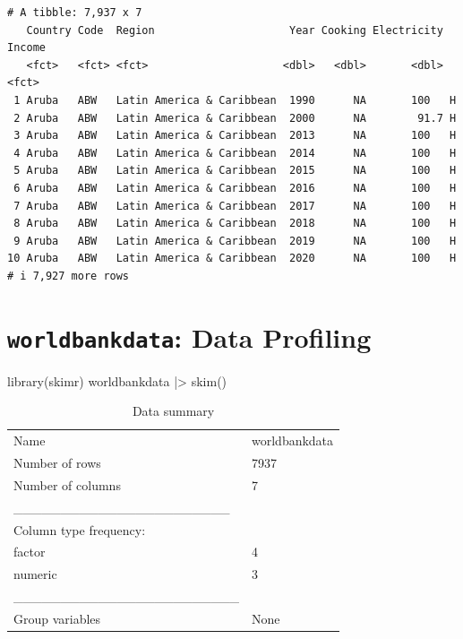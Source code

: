 \documentclass[
  letterpaper,
  DIV=11,
  numbers=noendperiod]{scrreprt}
\newenvironment{Shaded}{\begin{snugshade}}{\end{snugshade}}
\newcommand{\FunctionTok}[1]{\textcolor[rgb]{0.28,0.35,0.67}{#1}}
\newcommand{\NormalTok}[1]{\textcolor[rgb]{0.00,0.23,0.31}{#1}}
\newcommand{\SpecialCharTok}[1]{\textcolor[rgb]{0.37,0.37,0.37}{#1}}
\begin{document}
\begin{verbatim}
# A tibble: 7,937 x 7
   Country Code  Region                     Year Cooking Electricity Income
   <fct>   <fct> <fct>                     <dbl>   <dbl>       <dbl> <fct> 
 1 Aruba   ABW   Latin America & Caribbean  1990      NA       100   H     
 2 Aruba   ABW   Latin America & Caribbean  2000      NA        91.7 H     
 3 Aruba   ABW   Latin America & Caribbean  2013      NA       100   H     
 4 Aruba   ABW   Latin America & Caribbean  2014      NA       100   H     
 5 Aruba   ABW   Latin America & Caribbean  2015      NA       100   H     
 6 Aruba   ABW   Latin America & Caribbean  2016      NA       100   H     
 7 Aruba   ABW   Latin America & Caribbean  2017      NA       100   H     
 8 Aruba   ABW   Latin America & Caribbean  2018      NA       100   H     
 9 Aruba   ABW   Latin America & Caribbean  2019      NA       100   H     
10 Aruba   ABW   Latin America & Caribbean  2020      NA       100   H     
# i 7,927 more rows
\end{verbatim}

\section*{\texorpdfstring{\texttt{worldbankdata}: Data
Profiling}{worldbankdata: Data Profiling}}\label{worldbankdata-data-profiling}


\begin{Shaded}
\begin{Highlighting}[]
\FunctionTok{library}\NormalTok{(skimr)}
\NormalTok{worldbankdata }\SpecialCharTok{|\textgreater{}} 
  \FunctionTok{skim}\NormalTok{()}
\end{Highlighting}
\end{Shaded}

\begin{longtable}[]{@{}ll@{}}
\caption{Data summary}\tabularnewline
\toprule\noalign{}
\endfirsthead
\endhead
\bottomrule\noalign{}
\endlastfoot
Name & worldbankdata \\
Number of rows & 7937 \\
Number of columns & 7 \\
\_\_\_\_\_\_\_\_\_\_\_\_\_\_\_\_\_\_\_\_\_\_\_ & \\
Column type frequency: & \\
factor & 4 \\
numeric & 3 \\
\_\_\_\_\_\_\_\_\_\_\_\_\_\_\_\_\_\_\_\_\_\_\_\_ & \\
Group variables & None \\
\end{longtable}
\end{document}
